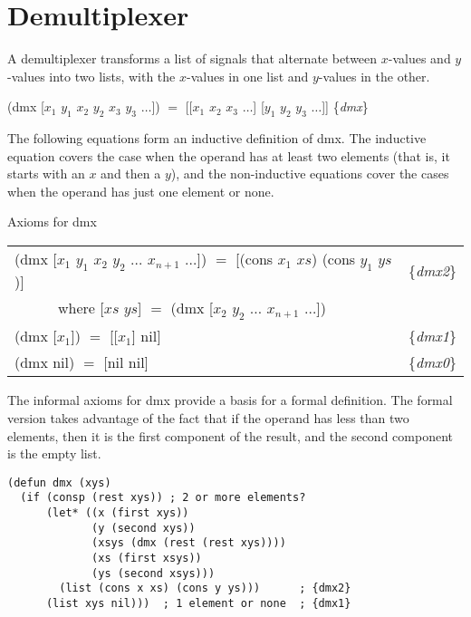 \section{Demultiplexer}
\label{sec:dmx}

A demultiplexer transforms a list of signals that alternate between
$x$-values and $y$-values into two lists,
with the $x$-values in one list and $y$-values in the other.

\hspace{1cm} \textsf{(dmx [$x_1$ $y_1$ $x_2$ $y_2$ $x_3$ $y_3$ $\dots$]) $=$
[[$x_1$ $x_2$ $x_3$ $\dots$] [$y_1$ $y_2$ $y_3$ $\dots$]]}
\hfill \{\emph{dmx}\}

The following equations form an inductive definition of \textsf{dmx}.
The inductive equation covers the case when
the operand has at least two elements
(that is, it starts with an $x$ and then a $y$),
and the non-inductive equations cover the cases
when the operand has just one element or none.

\begin{center}
Axioms for \textsf{dmx}
\begin{tabular}{ll}
\textsf{(dmx [$x_1$ $y_1$ $x_2$ $y_2$ $\dots$ $x_{n+1}$ $\dots$])} $=$ \textsf{[(cons $x_1$ $xs$) (cons $y_1$ $ys$)] }&\{\emph{dmx2}\} \\
~~~~~~where \textsf{[$xs$ $ys$]} $=$ \textsf{(dmx [$x_2$ $y_2$ $\dots$ $x_{n+1}$ $\dots$])}       &\\
\textsf{(dmx [$x_1$]) $=$  [[$x_1$] nil]}                                                         &\{\emph{dmx1}\} \\
\textsf{(dmx nil) $=$ [nil nil] }                                                                 &\{\emph{dmx0}\} \\
\end{tabular}
\end{center}

The informal axioms for \textsf{dmx} provide a basis for a formal definition.
The formal version takes advantage of the fact that if the operand
has less than two elements, then it is the first component of the result,
and the second component is the empty list.

\label{dmx-defun}
\begin{Verbatim}
(defun dmx (xys)
  (if (consp (rest xys)) ; 2 or more elements?
      (let* ((x (first xys))
             (y (second xys))
             (xsys (dmx (rest (rest xys))))
             (xs (first xsys))
             (ys (second xsys)))
        (list (cons x xs) (cons y ys)))      ; {dmx2}
      (list xys nil)))  ; 1 element or none  ; {dmx1}
\end{Verbatim}

